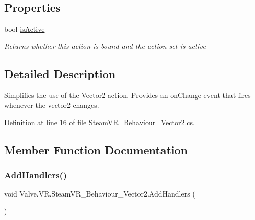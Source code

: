 \subsection*{Properties}
\begin{DoxyCompactItemize}
\item 
bool \mbox{\hyperlink{class_valve_1_1_v_r_1_1_steam_v_r___behaviour___vector2_a857c50030589218065d3abc4a692f891}{is\+Active}}
\begin{DoxyCompactList}\small\item\em Returns whether this action is bound and the action set is active \end{DoxyCompactList}\end{DoxyCompactItemize}


\subsection{Detailed Description}
Simplifies the use of the Vector2 action. Provides an on\+Change event that fires whenever the vector2 changes. 



Definition at line 16 of file Steam\+V\+R\+\_\+\+Behaviour\+\_\+\+Vector2.\+cs.



\subsection{Member Function Documentation}
\mbox{\label{class_valve_1_1_v_r_1_1_steam_v_r___behaviour___vector2_a44510489e8fb9f27372d569ee6a2693a}} 
\subsubsection{\texorpdfstring{AddHandlers()}{AddHandlers()}}
{\footnotesize\ttfamily void Valve.\+V\+R.\+Steam\+V\+R\+\_\+\+Behaviour\+\_\+\+Vector2.\+Add\+Handlers (\begin{DoxyParamCaption}{ }\end{DoxyParamCaption})\hspace{0.3cm}{\ttfamily [protected]}}



